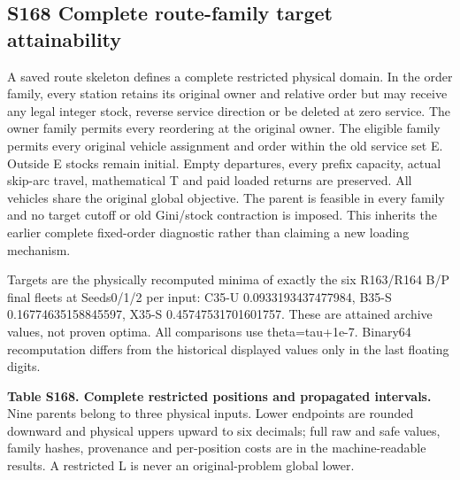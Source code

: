 \documentclass[
  american,
  11pt,
]{article}
\begin{document}
\clearpage

\subsection{S168 Complete route-family target
attainability}\label{s168-complete-route-family-target-attainability}

A saved route skeleton defines a complete restricted physical domain. In
the order family, every station retains its original owner and relative
order but may receive any legal integer stock, reverse service direction
or be deleted at zero service. The owner family permits every reordering
at the original owner. The eligible family permits every original
vehicle assignment and order within the old service set E. Outside E
stocks remain initial. Empty departures, every prefix capacity, actual
skip-arc travel, mathematical T and paid loaded returns are preserved.
All vehicles share the original global objective. The parent is feasible
in every family and no target cutoff or old Gini/stock contraction is
imposed. This inherits the earlier complete fixed-order diagnostic
rather than claiming a new loading mechanism.

Targets are the physically recomputed minima of exactly the six
R163/R164 B/P final fleets at Seeds0/1/2 per input: C35-U
0.0933193437477984, B35-S 0.16774635158845597, X35-S
0.45747531701601757. These are attained archive values, not proven
optima. All comparisons use theta=tau+1e-7. Binary64 recomputation
differs from the historical displayed values only in the last floating
digits.


\textbf{Table S168. Complete restricted positions and propagated
intervals.} Nine parents belong to three physical inputs. Lower
endpoints are rounded downward and physical uppers upward to six
decimals; full raw and safe values, family hashes, provenance and
per-position costs are in the machine-readable results. A restricted L
is never an original-problem global lower.
\end{document}
